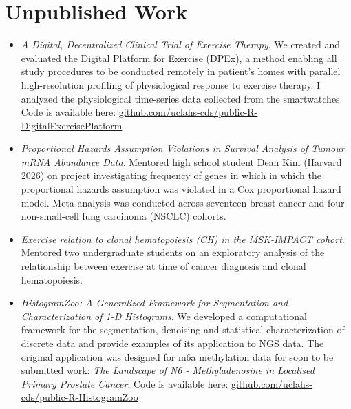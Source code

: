 \documentclass[11pt,a4paper]{moderncv}
\begin{document}
\section{Unpublished Work}
\begin{itemize}
    \item \textit{A Digital, Decentralized Clinical Trial of Exercise Therapy}. We created and evaluated the Digital Platform for Exercise (DPEx), a method enabling all study procedures to be conducted remotely in patient’s homes with parallel high-resolution profiling of physiological response to exercise therapy. I analyzed the physiological time-series data collected from the smartwatches. Code is available here: \href{https://github.com/uclahs-cds/public-R-DigitalExercisePlatform}{github.com/uclahs-cds/public-R-DigitalExercisePlatform}
    \item \textit{Proportional Hazards Assumption Violations in Survival Analysis of Tumour mRNA Abundance Data}. Mentored high school student Dean Kim (Harvard 2026) on project investigating frequency of genes in which in which the proportional hazards assumption was violated in a Cox proportional hazard model. Meta-analysis was conducted across seventeen breast cancer and four non-small-cell lung carcinoma (NSCLC) cohorts.
    \item \textit{Exercise relation to clonal hematopoiesis (CH) in the MSK-IMPACT cohort}. Mentored two undergraduate students on an exploratory analysis of the relationship between exercise at time of cancer diagnosis and clonal hematopoiesis.
    \item \textit{HistogramZoo: A Generalized Framework for Segmentation and Characterization of 1-D Histograms}. We developed a computational framework for the segmentation, denoising and statistical characterization of discrete data and provide examples of its application to NGS data. The original application was designed for m6a methylation data for soon to be submitted work: \textit{The Landscape of N6 - Methyladenosine in Localised Primary Prostate Cancer}. Code is available here: \href{https://github.com/uclahs-cds/public-R-HistogramZoo}{github.com/uclahs-cds/public-R-HistogramZoo}

\end{itemize}

\printbibliography[title={Publications}]
\end{document}
